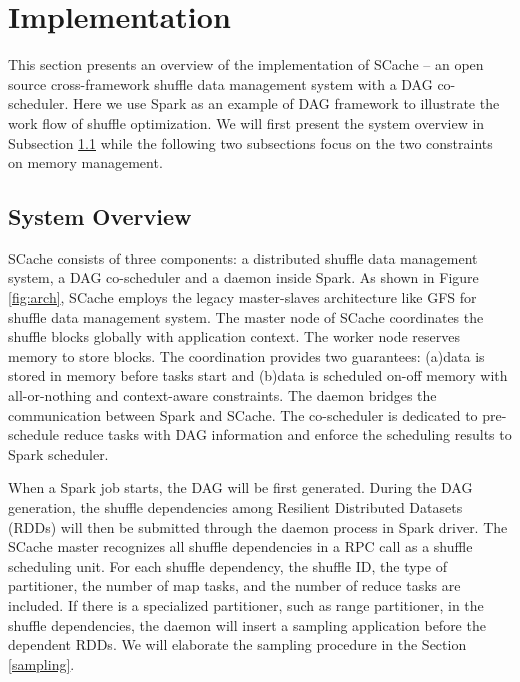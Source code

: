\section{Implementation}\label{impl}
This section presents an overview of the implementation of SCache -- an open source cross-framework shuffle data management system with a DAG co-scheduler. Here we use Spark as an example of DAG framework to illustrate the work flow of shuffle optimization. We will first present the system overview in Subsection \ref{arch} while the following two subsections focus on the two constraints on memory management.

\subsection{System Overview}\label{arch}
SCache consists of three components: a distributed shuffle data management system, a DAG co-scheduler and a daemon inside Spark. As shown in Figure \ref{fig:arch}, SCache employs the legacy master-slaves architecture like GFS \cite{gfs} for shuffle data management system. 
The master node of SCache coordinates the shuffle blocks globally with application context. The worker node reserves memory to store blocks.
The coordination provides two guarantees: (a)data is stored in memory before tasks start and (b)data is scheduled on-off memory with all-or-nothing and context-aware constraints. 
The daemon bridges the communication between Spark and SCache. The co-scheduler is dedicated to pre-schedule reduce tasks with DAG information and enforce the scheduling results to Spark scheduler.

When a Spark job starts, the DAG will be first generated. 
During the DAG generation, the shuffle dependencies among Resilient Distributed Datasets (RDDs) will then be submitted through the daemon process in Spark driver. The SCache master recognizes all shuffle dependencies in a RPC call as a shuffle scheduling unit.
For each shuffle dependency, the shuffle ID, the type of partitioner, the number of map tasks, and the number of reduce tasks are included.  If there is a specialized partitioner, such as range partitioner, in the shuffle dependencies, the daemon will insert a sampling application before the dependent RDDs. We will elaborate the sampling procedure in the Section \ref{sampling}.

